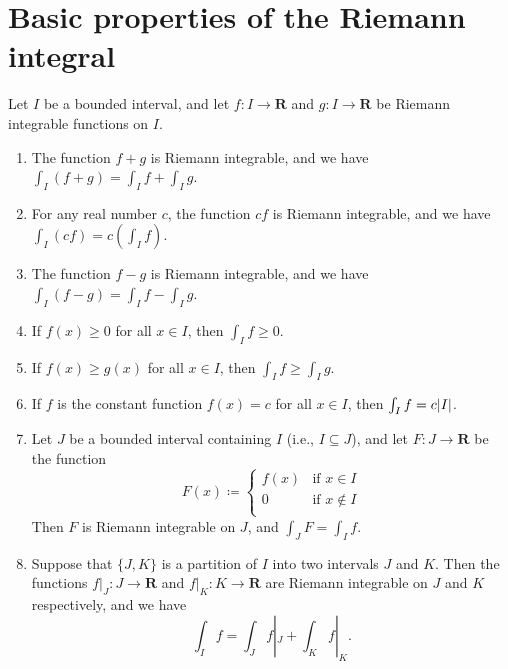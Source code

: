 \section{Basic properties of the Riemann integral}\label{sec 11.4}

\begin{theorem}\label{11.4.1}
    Let \(I\) be a bounded interval, and let \(f : I \to \mathbf{R}\) and \(g : I \to \mathbf{R}\) be Riemann integrable functions on \(I\).
    \begin{enumerate}
        \item The function \(f + g\) is Riemann integrable, and we have \(\int_I (f + g) = \int_I f + \int_I g\).
        \item For any real number \(c\), the function \(cf\) is Riemann integrable, and we have \(\int_I (cf) = c(\int_I f)\).
        \item The function \(f - g\) is Riemann integrable, and we have \(\int_I (f - g) = \int_I f - \int_I g\).
        \item If \(f(x) \geq 0\) for all \(x \in I\), then \(\int_I f \geq 0\).
        \item If \(f(x) \geq g(x)\) for all \(x \in I\), then \(\int_I f \geq \int_I g\).
        \item If \(f\) is the constant function \(f(x) = c\) for all \(x \in I\), then \(\int_I f = c \abs*{I}\).
        \item Let \(J\) be a bounded interval containing \(I\) (i.e., \(I \subseteq J\)), and let \(F : J \to \mathbf{R}\) be the function
              \[
                  F(x) \coloneqq \begin{cases}
                      f(x) & \text{if } x \in I    \\
                      0    & \text{if } x \notin I \\
                  \end{cases}
              \]
              Then \(F\) is Riemann integrable on \(J\), and \(\int_J F = \int_I f\).
        \item Suppose that \(\{J, K\}\) is a partition of \(I\) into two intervals \(J\) and \(K\).
              Then the functions \(f|_J : J \to \mathbf{R}\) and \(f|_K : K \to \mathbf{R}\) are Riemann integrable on \(J\) and \(K\) respectively, and we have
              \[
                  \int_I f = \int_J f|_J + \int_K f|_K.
              \]
    \end{enumerate}
\end{theorem}

